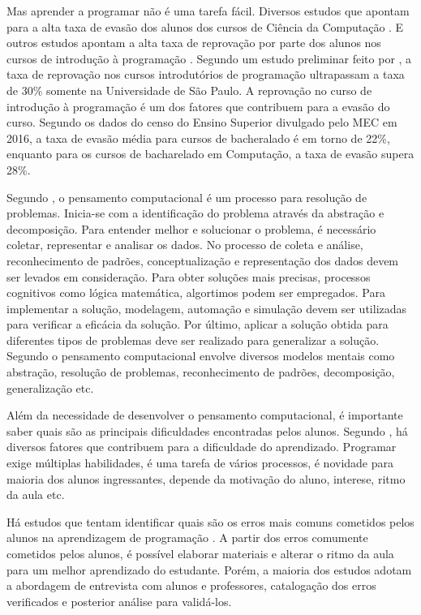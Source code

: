 Mas aprender a programar não é uma tarefa fácil. Diversos estudos que apontam para a alta taxa de evasão dos alunos dos cursos de Ciência da Computação \citep{Watson:2014:FRI:2591708.2591749}. E outros estudos apontam a alta taxa de reprovação por parte dos alunos nos cursos de introdução à programação \citep{Watson:2014:FRI:2591708.2591749, bosse:2015:cbie}. Segundo um estudo preliminar feito por \cite{bosse:2015:cbie}, a taxa de reprovação nos cursos introdutórios de programação ultrapassam a taxa de 30\% somente na Universidade de São Paulo. A reprovação no curso de introdução à programação é um dos fatores que contribuem para a evasão do curso. Segundo os dados do censo do Ensino Superior divulgado pelo MEC em 2016, a taxa de evasão média para cursos de bacheralado é em torno de 22\%, enquanto para os cursos de bacharelado em Computação, a taxa de evasão supera 28\%.

Segundo \cite{Kalelioglu:2016}, o pensamento computacional é um processo para resolução de problemas. Inicia-se com a identificação do problema através da abstração e decomposição. Para entender melhor e solucionar o problema, é necessário coletar, representar e analisar os dados. No processo de coleta e análise, reconhecimento de padrões, conceptualização e representação dos dados devem ser levados em consideração. Para obter soluções mais precisas, processos cognitivos como lógica matemática, algortimos podem ser empregados. Para implementar a solução, modelagem, automação e simulação devem ser utilizadas para verificar a eficácia da solução. Por último, aplicar a solução obtida para diferentes tipos de problemas deve ser realizado para generalizar a solução. Segundo \cite{Kalelioglu:2016} o pensamento computacional envolve diversos modelos mentais como abstração, resolução de problemas, reconhecimento de padrões, decomposição, generalização etc.

Além da necessidade de desenvolver o pensamento computacional, é importante saber quais são as principais dificuldades encontradas pelos alunos. Segundo \cite{jenkins:2002}, há diversos fatores que contribuem para a dificuldade do aprendizado. Programar exige múltiplas habilidades, é uma tarefa de vários processos, é novidade para maioria dos alunos ingressantes, depende da motivação do aluno, interese, ritmo da aula etc.

Há estudos que tentam identificar quais são os erros mais comuns cometidos pelos alunos na aprendizagem de programação \citep{Hristova:2003:ICJ:792548.611956, Caceffo:2016:DCS:2839509.2844559}. A partir dos erros comumente cometidos pelos alunos, é possível elaborar materiais e alterar o ritmo da aula para um melhor aprendizado do estudante. Porém, a maioria dos estudos adotam a abordagem de entrevista com alunos e professores, catalogação dos erros verificados e posterior análise para validá-los.

